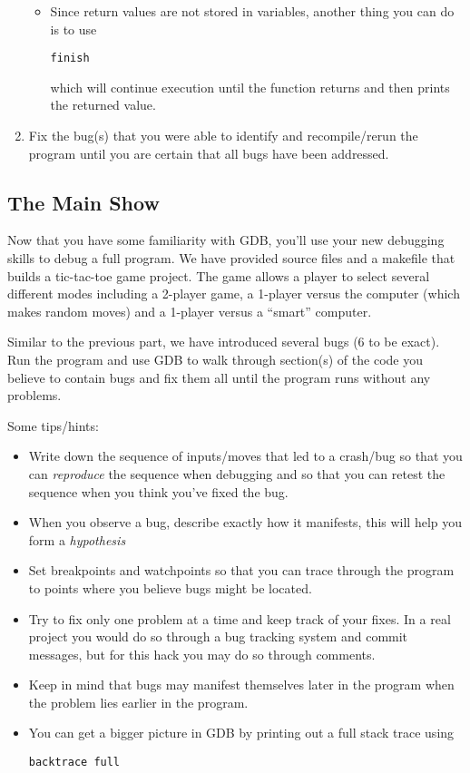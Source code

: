 \documentclass[12pt]{scrartcl}
\begin{document}
\begin{enumerate}
\begin{itemize}
	 \item Since return values are not stored in variables, another thing
	 you can do is to use 

	 \texttt{finish}
	 
	 which will continue execution until the function returns and then
	 prints the returned value.
  \end{itemize}

  \item Fix the bug(s) that you were able to identify and recompile/rerun the
  program until you are certain that all bugs have been addressed.
  
\end{enumerate}


\subsection*{The Main Show}

Now that you have some familiarity with GDB, you'll use your new debugging
skills to debug a full program.  We have provided source files and a 
makefile that builds a tic-tac-toe game project.  The game allows a player
to select several different modes including a 2-player game, a 1-player 
versus the computer (which makes random moves) and a 1-player versus 
a ``smart'' computer.

Similar to the previous part, we have introduced several bugs (6 to be exact).
Run the program and use GDB to walk through section(s) of the code you believe
to contain bugs and fix them all until the program runs without any problems.

Some tips/hints:
\begin{itemize}
  \item Write down the sequence of inputs/moves that led to a crash/bug 
  so that you can \emph{reproduce} the sequence when debugging and so that
  you can retest the sequence when you think you've fixed the bug.
  \item When you observe a bug, describe exactly how it manifests, this 
  will help you form a \emph{hypothesis} 
  \item Set breakpoints and watchpoints so that you can trace through
  the program to points where you believe bugs might be located.
  \item Try to fix only one problem at a time and keep track of your
  fixes.  In a real project you would do so through a bug tracking system
  and commit messages, but for this hack you may do so through comments.
  \item Keep in mind that bugs may manifest themselves later in the program
  when the problem lies earlier in the program.
  \item You can get a bigger picture in GDB by printing out a full stack trace
  using 
  
  \texttt{backtrace full}

\end{itemize}  
\end{document}
